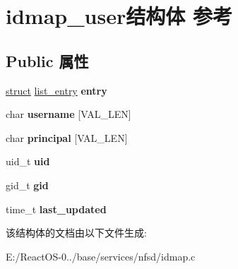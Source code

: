 \hypertarget{structidmap__user}{}\section{idmap\+\_\+user结构体 参考}
\label{structidmap__user}
\subsection*{Public 属性}
\begin{DoxyCompactItemize}
\item 
\mbox{\label{structidmap__user_ac9f1b0e6e9af658e6c2b91a917447265}} 
\hyperlink{interfacestruct}{struct} \hyperlink{structlist__entry}{list\+\_\+entry} {\bfseries entry}
\item 
\mbox{\label{structidmap__user_a3121dc7b3aec9eed2702debf6a4ff435}} 
char {\bfseries username} \mbox{[}V\+A\+L\+\_\+\+L\+EN\mbox{]}
\item 
\mbox{\label{structidmap__user_ac8ae1fe08f610750874e7df6315833f8}} 
char {\bfseries principal} \mbox{[}V\+A\+L\+\_\+\+L\+EN\mbox{]}
\item 
\mbox{\label{structidmap__user_af1450d3cd38e22759a38c68025d81305}} 
uid\+\_\+t {\bfseries uid}
\item 
\mbox{\label{structidmap__user_a4728304fb2ded00d74426713d1c29c7f}} 
gid\+\_\+t {\bfseries gid}
\item 
\mbox{\label{structidmap__user_a7880394fe1e80da936f175fed958f859}} 
time\+\_\+t {\bfseries last\+\_\+updated}
\end{DoxyCompactItemize}


该结构体的文档由以下文件生成\+:\begin{DoxyCompactItemize}
\item 
E\+:/\+React\+O\+S-\/0../base/services/nfsd/idmap.\+c\end{DoxyCompactItemize}
